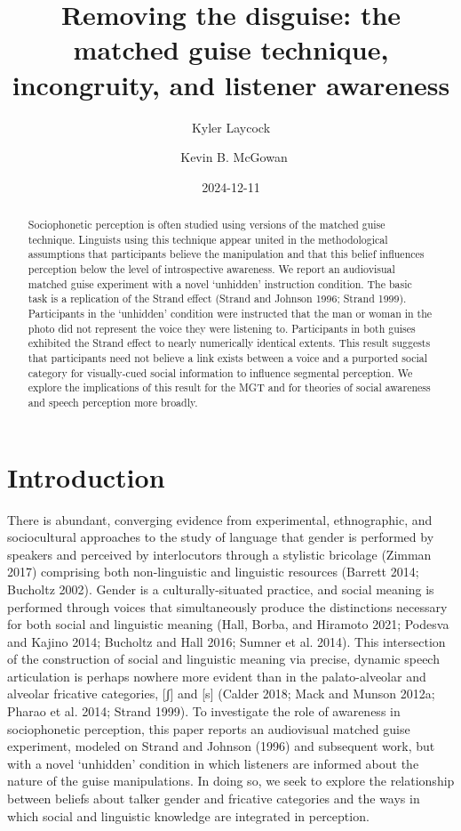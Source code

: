 \documentclass[
  letterpaper,
  DIV=11,
  numbers=noendperiod]{scrartcl}
\title{Removing the disguise: the matched guise technique, incongruity,
and listener awareness}
\author{Kyler Laycock \and ~Kevin B. McGowan}
\date{2024-12-11}
\begin{document}
\maketitle
\begin{abstract}
Sociophonetic perception is often studied using versions of the matched
guise technique. Linguists using this technique appear united in the
methodological assumptions that participants believe the manipulation
and that this belief influences perception below the level of
introspective awareness. We report an audiovisual matched guise
experiment with a novel `unhidden' instruction condition. The basic task
is a replication of the Strand effect (Strand and Johnson 1996; Strand
1999). Participants in the `unhidden' condition were instructed that the
man or woman in the photo did not represent the voice they were
listening to. Participants in both guises exhibited the Strand effect to
nearly numerically identical extents. This result suggests that
participants need not believe a link exists between a voice and a
purported social category for visually-cued social information to
influence segmental perception. We explore the implications of this
result for the MGT and for theories of social awareness and speech
perception more broadly.
\end{abstract}


\section{Introduction}\label{sec-intro}

There is abundant, converging evidence from experimental, ethnographic,
and sociocultural approaches to the study of language that gender is
performed by speakers and perceived by interlocutors through a stylistic
bricolage (Zimman 2017) comprising both non-linguistic and linguistic
resources (Barrett 2014; Bucholtz 2002). Gender is a culturally-situated
practice, and social meaning is performed through voices that
simultaneously produce the distinctions necessary for both social and
linguistic meaning (Hall, Borba, and Hiramoto 2021; Podesva and Kajino
2014; Bucholtz and Hall 2016; Sumner et al. 2014). This intersection of
the construction of social and linguistic meaning via precise, dynamic
speech articulation is perhaps nowhere more evident than in the
palato-alveolar and alveolar fricative categories, {[}ʃ{]} and {[}s{]}
(Calder 2018; Mack and Munson 2012a; Pharao et al. 2014; Strand 1999).
To investigate the role of awareness in sociophonetic perception, this
paper reports an audiovisual matched guise experiment, modeled on Strand
and Johnson (1996) and subsequent work, but with a novel `unhidden'
condition in which listeners are informed about the nature of the guise
manipulations. In doing so, we seek to explore the relationship between
beliefs about talker gender and fricative categories and the ways in
which social and linguistic knowledge are integrated in perception.
\end{document}
